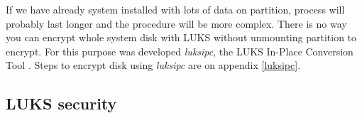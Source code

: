 If we have already system installed with lots of data on partition, process will probably last longer and the procedure will be more complex.
There is no way you can encrypt whole system disk with LUKS without unmounting partition to encrypt.
For this purpose was developed {\it luksipc}, the LUKS In-Place Conversion Tool \cite{luksipc}.
Steps to encrypt disk using {\it luksipc} are on appendix \ref{luksipc}.

\subsection{LUKS security}

\cite{team2012security}
